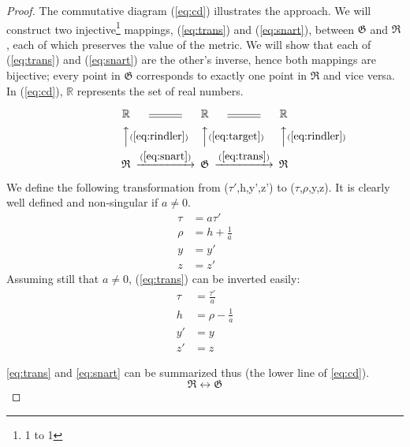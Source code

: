 \documentclass[11pt,a4paper]{article}
\begin{document}
\begin{proof} The commutative diagram (\ref{eq:cd}) illustrates the approach. We will construct two injective\footnote{1 to 1} mappings, (\ref{eq:trans}) and (\ref{eq:snart}), between $\mathfrak{G}$ and $\mathfrak{R}$, each of which preserves the value of the metric. We will show that each of (\ref{eq:trans}) and (\ref{eq:snart}) are the other's inverse, hence both mappings are bijective; every point in $\mathfrak{G}$ corresponds to exactly one point in $\mathfrak{R}$ and vice versa. In (\ref{eq:cd}), $\mathbb{R}$ represents the set of real numbers.
	
\begin{equation} \label{eq:cd}
\begin{CD}
\mathbb{R}     @=  \mathbb{R}  @=  \mathbb{R}\\
@AA(\ref{eq:rindler})A    @AA(\ref{eq:target})A    @AA(\ref{eq:rindler})A\\
\mathfrak{R}     @>(\ref{eq:snart})>>   \mathfrak{G}  @>(\ref{eq:trans})>>   \mathfrak{R}
\end{CD}
\end{equation}	

We define the following transformation from ($\tau'$,h,y',z') to ($\tau$,$\rho$,y,z). It is clearly well defined and non-singular if $a\neq0$.
\begin{subequations} \label{eq:trans}
\begin{align}
\tau&=a\tau' \\
\rho&=h+\frac{1}{a} \\
y&=y' \\
z&=z'
\end{align}
\end{subequations}
Assuming still that $a\neq0$, (\ref{eq:trans}) can be inverted easily:
\begin{subequations} \label{eq:snart}
	\begin{align}
	\tau&=\frac{\tau'}{a} \\
	h&=\rho-\frac{1}{a}  \\
	y'&=y \\
	z'&=z
	\end{align}
\end{subequations}

\eqref{eq:trans} and \eqref{eq:snart} can be summarized thus (the lower line of \ref{eq:cd}).
\begin{equation} \label{eq:morphisms}
\mathfrak{R}\leftrightarrow\mathfrak{G}
\end{equation}


\end{proof}
\end{document}
